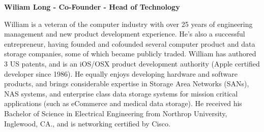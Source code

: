 \documentclass{article}
\begin{document}
\begin {framed}
\begin {center}
\textbf{Wiliam Long - Co-Founder - Head of Technology}\par
\end {center}
William is a veteran of the computer industry with over 25 years of engineering management and new product development experience.  He's also a successful entrepreneur, having founded and cofounded several computer product and data storage companies, some of which became publicly traded.  William has authored 3 US patents, and is an iOS/OSX product development authority (Apple certified developer since 1986).  He equally enjoys developing hardware and software products, and brings considerable expertise in Storage Area Networks (SANs), NAS systems, and enterprise class data storage systems for mission critical applications (such as eCommerce and medical data storage).  He received his Bachelor of Science in Electrical Engineering from Northrop University, Inglewood, CA., and is networking certified by Cisco.
\end {framed}

\clearpage
 
\printglossaries
\end{document}
